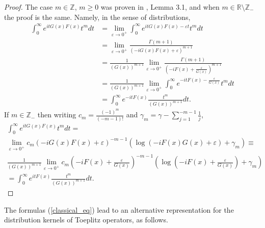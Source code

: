 \documentclass{article}
\newcommand{\RR}{\mathbb R}
\newcommand{\ZZ}{\mathbb Z}
\begin{document}
\begin{proof}
The case $m \in \ZZ$, $m \ge 0$ was proven in \cite{hsiao_shen}, Lemma 3.1, and when $m \in \RR \setminus \ZZ_-$ the proof is the same. Namely, in the sense of distributions, $$\begin{aligned}\int_0^\infty e^{it G(x) F(x)} t^m dt &= \lim_{\varepsilon \to 0^+} \int_0^\infty e^{it G(x) F(x) - \varepsilon t}t^m dt \\ &= \lim_{\varepsilon \to 0^+} \frac {\Gamma(m+1)}{(-i G(x) F(x) +\varepsilon)^{m+1}} \\ &= \frac 1 {(G(x))^{m+1}} \lim_{\varepsilon \to 0^+} \frac{\Gamma(m+1)}{\left(-iF(x) + \frac \varepsilon {G(x)}\right)^{m+1}} \\ &=\frac 1 {(G(x))^{m+1}} \lim_{\varepsilon \to 0^+} \int_0^\infty e^{-it F(x) -\frac{\varepsilon}{G(x)}} t^m dt \\ &= \int_0^\infty e^{-it F(x)} \frac{t^m}{(G(x))^{m+1}} dt.\end{aligned}$$
If $m \in \ZZ_-$ then writing $c_m = \frac{(-1)^m}{(-m-1)!}$ and $\gamma_m = \gamma -\sum_{j=1}^{-m-1} \frac 1 j$,\begin{multline*} \int_0^\infty e^{it G(x) F(x)} t^m dt =\\ \lim_{\varepsilon \to 0^+}c_m(-iG(x) F(x) + \varepsilon)^{-m-1} \left(\log(-i F(x) G(x) +\varepsilon) + \gamma_m \right) \equiv \\  \frac 1 {(G(x))^{m+1}} \lim_{\varepsilon \to 0^+} c_m\left(-iF(x) + \frac \varepsilon{G(x)}\right)^{-m-1} \left(\log\left(-i F(x) + \frac \varepsilon{G(x)}\right) + \gamma_m \right)\\ = \int_0^\infty e^{it F(x)} \frac{t^m}{(G(x))^{m+1}} dt.\end{multline*}
\end{proof}
The formulas (\ref{classical_eq}) lead to an alternative representation for the distribution kernels of Toeplitz operators, as follows.
%
\end{document}
